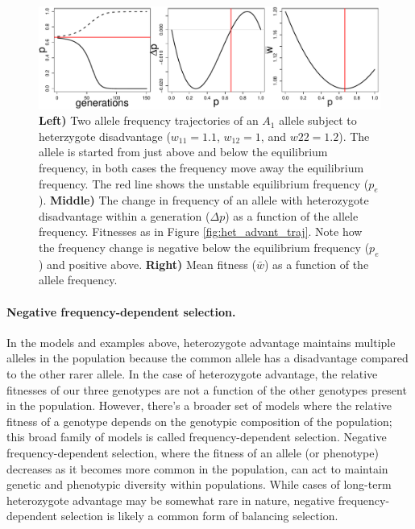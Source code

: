       \begin{figure}
\begin{center}
  \includegraphics[width = 0.8 \textwidth]{figures/het_disadvant_dp_wbar.pdf}
\end{center}
\caption{
{\bf Left)} Two allele frequency trajectories of an $A_1$ allele subject to
  heterzygote disadvantage ($w_{11}=1.1$, $w_{12}=1$, and
  $w22=1.2$). The allele is started from just above and below the
  equilibrium frequency, in both cases the frequency move away the equilibrium frequency. The red line shows
the unstable equilibrium frequency ($p_e$). 
  {\bf Middle)} The change in frequency of an allele with heterozygote
  disadvantage within a generation ($\Delta p$) as a function of the allele
frequency. Fitnesses as in Figure \ref{fig:het_advant_traj}. Note how the frequency change is negative below the
equilibrium frequency ($p_e$) and positive above. {\bf Right)} Mean
fitness ($\bar{w}$) as a function of the allele frequency. } \label{fig:het_disadvant_dp_wbar}
\end{figure}


\paragraph{Negative frequency-dependent selection.}
In the models and examples above, heterozygote advantage maintains multiple alleles in the population because the common allele has a disadvantage compared to the
other rarer allele. In the case of heterozygote advantage, the
relative fitnesses of our three genotypes are not a function of the
other genotypes present in the population. However, there's a broader set of models where the relative fitness of a genotype depends on the
genotypic composition of the population; this broad family of models
is called frequency-dependent selection. Negative frequency-dependent selection, where the fitness of an allele
(or phenotype) decreases as it becomes more common in the population, can act to maintain genetic and phenotypic diversity within populations. While cases of long-term heterozygote advantage may be somewhat rare in nature, negative frequency-dependent selection is likely a common form of
balancing selection.

